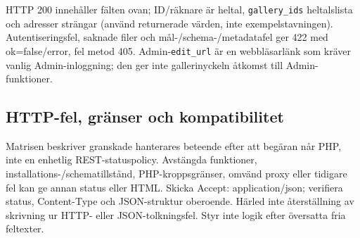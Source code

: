 \documentclass[11pt,a4paper]{article}
\newcommand{\codeword}[1]{\nolinkurl{#1}}
\begin{document}
HTTP 200 innehåller fälten ovan; ID/räknare är heltal, \codeword{gallery_ids} heltalslista
och adresser strängar (använd returnerade värden, inte exempelstavningen).
Autentiseringsfel, saknade filer och mål-/schema-/metadatafel ger 422 med ok=false/error,
fel metod 405. Admin-\codeword{edit_url} är en webbläsarlänk som kräver vanlig
Admin-inloggning; den ger inte gallerinyckeln åtkomst till Admin-funktioner.

\subsection{\texorpdfstring{HTTP-fel, gränser och kompatibilitet}{HTTP-fel, gränser och kompatibilitet}}

\label{api352:errors}

Matrisen beskriver granskade hanterares beteende efter att begäran når PHP, inte en enhetlig
REST-statuspolicy. Avstängda funktioner, installations-/schematillstånd, PHP-kroppsgränser,
omvänd proxy eller tidigare fel kan ge annan status eller HTML. Skicka Accept:
application/json; verifiera status, Content-Type och JSON-struktur oberoende. Härled inte
återställning av skrivning ur HTTP- eller JSON-tolkningsfel. Styr inte logik efter översatta
fria feltexter.
\end{document}
